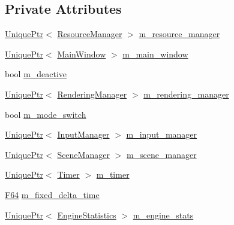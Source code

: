 \subsection*{Private Attributes}
\begin{DoxyCompactItemize}
\item 
\hyperlink{namespacemage_a3316d7143a973e37adf1110f2e80ca31}{Unique\+Ptr}$<$ \hyperlink{classmage_1_1_resource_manager}{Resource\+Manager} $>$ \hyperlink{classmage_1_1_engine_ac8d94579e72983a99a78be6b9b606a28}{m\+\_\+resource\+\_\+manager}
\item 
\hyperlink{namespacemage_a3316d7143a973e37adf1110f2e80ca31}{Unique\+Ptr}$<$ \hyperlink{classmage_1_1_main_window}{Main\+Window} $>$ \hyperlink{classmage_1_1_engine_a3aea7e8c0c1247cac570334a3d3543d6}{m\+\_\+main\+\_\+window}
\item 
bool \hyperlink{classmage_1_1_engine_ab8a4b0157403708ae7d1d018a95b4c63}{m\+\_\+deactive}
\item 
\hyperlink{namespacemage_a3316d7143a973e37adf1110f2e80ca31}{Unique\+Ptr}$<$ \hyperlink{classmage_1_1_rendering_manager}{Rendering\+Manager} $>$ \hyperlink{classmage_1_1_engine_a81c7475c3501f84f9bd9c7bbeaebfcb6}{m\+\_\+rendering\+\_\+manager}
\item 
bool \hyperlink{classmage_1_1_engine_aa5cb2e0b7bb2c4a9020e79ab832ee221}{m\+\_\+mode\+\_\+switch}
\item 
\hyperlink{namespacemage_a3316d7143a973e37adf1110f2e80ca31}{Unique\+Ptr}$<$ \hyperlink{classmage_1_1_input_manager}{Input\+Manager} $>$ \hyperlink{classmage_1_1_engine_a8e9048208a6a5c5b034aaa1cbdab28bc}{m\+\_\+input\+\_\+manager}
\item 
\hyperlink{namespacemage_a3316d7143a973e37adf1110f2e80ca31}{Unique\+Ptr}$<$ \hyperlink{classmage_1_1_scene_manager}{Scene\+Manager} $>$ \hyperlink{classmage_1_1_engine_afac8085ae572d623e77b1e0847440ab4}{m\+\_\+scene\+\_\+manager}
\item 
\hyperlink{namespacemage_a3316d7143a973e37adf1110f2e80ca31}{Unique\+Ptr}$<$ \hyperlink{classmage_1_1_timer}{Timer} $>$ \hyperlink{classmage_1_1_engine_a4daac998928a6c087b310c52b3f26ae4}{m\+\_\+timer}
\item 
\hyperlink{namespacemage_ad26233bbec640deda836e572c1a23708}{F64} \hyperlink{classmage_1_1_engine_a95557e1b6cba52b393c94d80d80bea4c}{m\+\_\+fixed\+\_\+delta\+\_\+time}
\item 
\hyperlink{namespacemage_a3316d7143a973e37adf1110f2e80ca31}{Unique\+Ptr}$<$ \hyperlink{structmage_1_1_engine_statistics}{Engine\+Statistics} $>$ \hyperlink{classmage_1_1_engine_aa0c82f248a2fbec3fbf778665a440edc}{m\+\_\+engine\+\_\+stats}
\end{DoxyCompactItemize}
